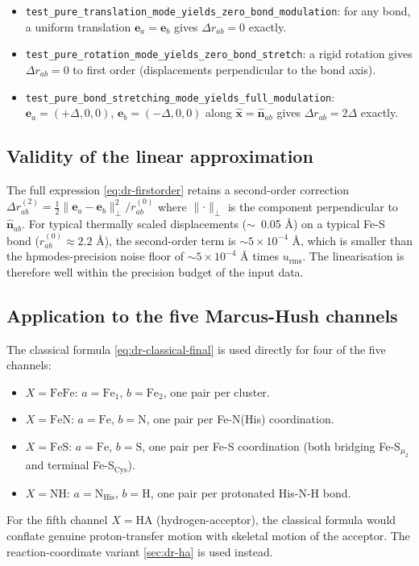 \documentclass[10pt,a4paper,twoside]{article}
\newcommand{\evec}{\mathbf{e}}
\newcommand{\xhat}{\hat{\mathbf{x}}}
\newcommand{\nhat}{\hat{\mathbf{n}}}
\newcommand{\urms}{u_{\mathrm{rms}}}
\newcommand{\fn}[1]{\texttt{#1}}
\begin{document}
\begin{derivbox}
\begin{itemize}
  \item \fn{test\_pure\_translation\_mode\_yields\_zero\_bond\_modulation}:
        for any bond, a uniform translation $\evec_a = \evec_b$
        gives $\Delta r_{ab} = 0$ exactly.
  \item \fn{test\_pure\_rotation\_mode\_yields\_zero\_bond\_stretch}:
        a rigid rotation gives $\Delta r_{ab} = 0$ to first order
        (displacements perpendicular to the bond axis).
  \item \fn{test\_pure\_bond\_stretching\_mode\_yields\_full\_modulation}:
        $\evec_a = (+\Delta, 0, 0)$, $\evec_b = (-\Delta, 0, 0)$
        along $\xhat = \nhat_{ab}$ gives $\Delta r_{ab} = 2\Delta$
        exactly.
\end{itemize}
\end{derivbox}

\subsection{Validity of the linear approximation}

The full expression \cref{eq:dr-firstorder} retains a second-order
correction
$\Delta r_{ab}^{(2)} = \tfrac{1}{2}\lVert\evec_a - \evec_b\rVert^2_\perp
  / r_{ab}^{(0)}$
where $\lVert\cdot\rVert_\perp$ is the component perpendicular to
$\nhat_{ab}$. For typical thermally scaled displacements
(\mbox{$\sim$}~0.05 \AA{}) on a typical Fe-S bond
($r_{ab}^{(0)} \approx 2.2$ \AA{}), the second-order term is
$\sim 5 \times 10^{-4}$ \AA{}, which is smaller than the
hpmodes-precision noise floor of $\sim 5 \times 10^{-4}$ \AA{}
times $\urms$. The linearisation is therefore well within the
precision budget of the input data.

\subsection{Application to the five Marcus-Hush channels}

The classical formula \cref{eq:dr-classical-final} is used directly
for four of the five channels:
\begin{itemize}
  \item $X = \text{FeFe}$: $a = \text{Fe}_1$, $b = \text{Fe}_2$, one
        pair per cluster.
  \item $X = \text{FeN}$: $a = \text{Fe}$, $b = \text{N}$, one pair
        per Fe-N(His) coordination.
  \item $X = \text{FeS}$: $a = \text{Fe}$, $b = \text{S}$, one pair
        per Fe-S coordination (both bridging Fe-S$_{\mu_2}$ and
        terminal Fe-S$_{\text{Cys}}$).
  \item $X = \text{NH}$: $a = \text{N}_\text{His}$, $b = \text{H}$,
        one pair per protonated His-N-H bond.
\end{itemize}
For the fifth channel $X = \text{HA}$ (hydrogen-acceptor), the
classical formula would conflate genuine proton-transfer motion
with skeletal motion of the acceptor. The reaction-coordinate
variant \cref{sec:dr-ha} is used instead.
\end{document}
